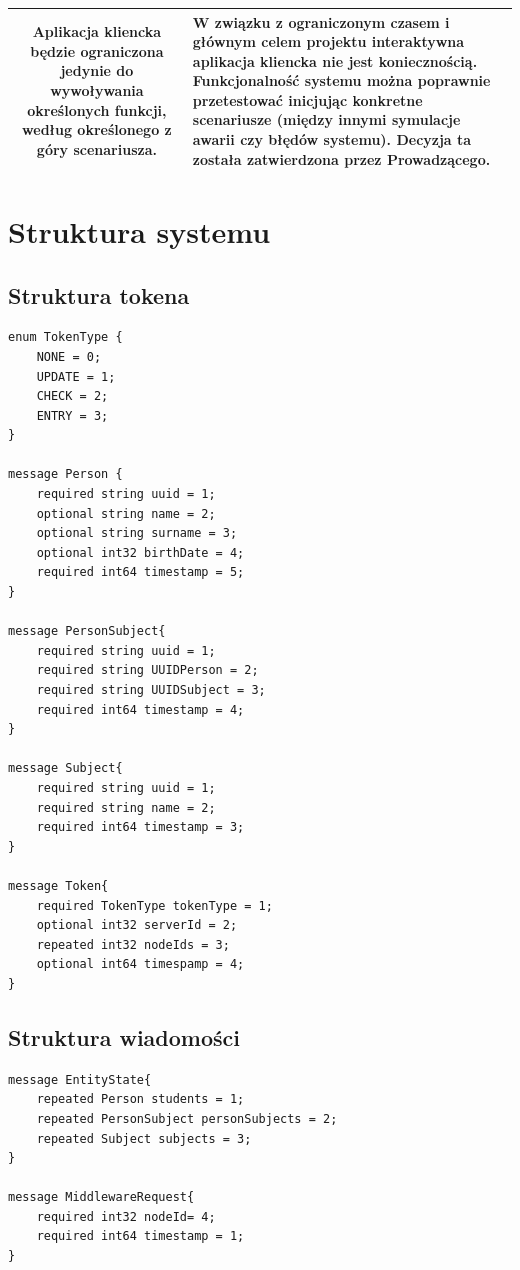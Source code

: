 {\begin{tabularx}{\textwidth}{|c|X|X|}
Aplikacja kliencka będzie ograniczona jedynie do wywoływania określonych funkcji, według określonego z góry scenariusza. & 
W związku z ograniczonym czasem i głównym celem projektu interaktywna aplikacja kliencka nie jest koniecznością. Funkcjonalność systemu można poprawnie przetestować inicjując konkretne scenariusze (między innymi symulacje awarii czy błędów systemu). Decyzja ta została zatwierdzona przez Prowadzącego.\\
\hline

\end{tabularx}

\section[Struktura systemu]{Struktura systemu}

\subsection{Struktura tokena}
\begin{lstlisting}
enum TokenType {
    NONE = 0;
    UPDATE = 1;
    CHECK = 2;
    ENTRY = 3;
}

message Person {
    required string uuid = 1;
    optional string name = 2;
    optional string surname = 3;
    optional int32 birthDate = 4;
    required int64 timestamp = 5;
}

message PersonSubject{
    required string uuid = 1;
    required string UUIDPerson = 2;
    required string UUIDSubject = 3;
    required int64 timestamp = 4;
}

message Subject{
    required string uuid = 1;
	required string name = 2;
	required int64 timestamp = 3;
}

message Token{
    required TokenType tokenType = 1;
    optional int32 serverId = 2;
    repeated int32 nodeIds = 3;
    optional int64 timespamp = 4;
}
\end{lstlisting}

\subsection[Struktura wiadomości]{Struktura wiadomości}
\begin{lstlisting}
message EntityState{
    repeated Person students = 1;
    repeated PersonSubject personSubjects = 2;
    repeated Subject subjects = 3;
}

message MiddlewareRequest{
	required int32 nodeId= 4;
    required int64 timestamp = 1;
}


\end{lstlisting}}
